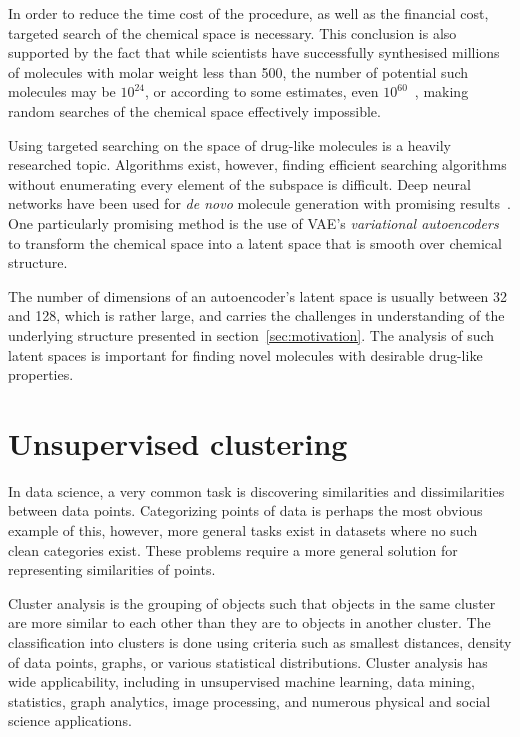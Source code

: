 In order to reduce the time cost of the procedure, as well as the financial cost, targeted search of the chemical space is necessary. This conclusion is also supported by the fact that while scientists have successfully synthesised millions of molecules with molar weight less than 500, the number of potential such molecules may be $10^{24}$, or according to some estimates, even $10^{60}$~\cite{bib:1060}, making random searches of the chemical space effectively impossible.

Using targeted searching on the space of drug-like molecules is a heavily researched topic. Algorithms exist, however, finding efficient searching algorithms without enumerating every element of the subspace is difficult. Deep neural networks have been used for \textit{de novo} molecule generation with promising results~\cite{bib:molsearch}. One particularly promising method is the use of VAE's \textit{variational autoencoders}~\cite{bib:vae} to transform the chemical space into a latent space that is smooth over chemical structure.

The number of dimensions of an autoencoder's latent space is usually between 32 and 128, which is rather large, and carries the challenges in understanding of the underlying structure presented in section~\ref{sec:motivation}. The analysis of such latent spaces is important for finding novel molecules with desirable drug-like properties.

\section{Unsupervised clustering}\label{sec:unsupervised-clustering}

In data science, a very common task is discovering similarities and dissimilarities between data points. Categorizing points of data is perhaps the most obvious example of this, however, more general tasks exist in datasets where no such clean categories exist. These problems require a more general solution for representing similarities of points.

Cluster analysis is the grouping of objects such that objects in the same cluster are more similar to each other than they are to objects in another cluster. The classification into clusters is done using criteria such as smallest distances, density of data points, graphs, or various statistical distributions. Cluster analysis has  wide applicability, including in unsupervised machine learning, data mining, statistics, graph analytics,  image processing, and numerous physical and social science applications.

